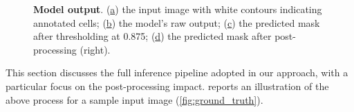 \begin{figure}
    \caption{\textbf{Model output}. 
    (\hyperref[fig:ground_truth]{a}) the input image with white contours indicating annotated cells; (\hyperref[fig:heatmap]{b}) the model's raw output; 
    (\hyperref[fig:thresh]{c}) the predicted mask after thresholding at 0.875; (\hyperref[fig:post_proc]{d}) the predicted mask after post-processing (right).}
    \label{fig:model_output}
\end{figure}
This section discusses the full inference pipeline adopted in our approach, with a particular focus on the post-processing impact.
 reports an illustration of the above process for a sample input image (\cref{fig:ground_truth}).

